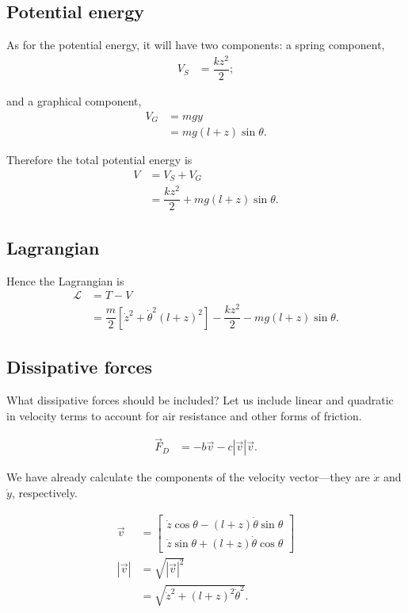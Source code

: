 \documentclass[12pt,a4paper,portrait]{article}
\newcommand{\lag}{\mathcal{L}}
\begin{document}
\subsection{Potential energy}
As for the potential energy, it will have two components: a spring component,
\begin{align*}
	V_S &= \dfrac{kz^2}{2};
\end{align*}

and a graphical component,
\begin{align*}
	V_G &= mgy \\
	&= mg(l+z)\sin{\theta}.
\end{align*}

Therefore the total potential energy is
\begin{align*}
	V &= V_S + V_G \\
	&= \dfrac{kz^2}{2} + mg(l+z)\sin{\theta}.
\end{align*}

\subsection{Lagrangian}
Hence the Lagrangian is
\begin{align*}
	\lag &= T - V \\
	&= \dfrac{m}{2} \left[\dot{z}^2 + \dot{\theta}^2(l+z)^2\right] - \dfrac{kz^2}{2} - mg(l+z)\sin{\theta}.
\end{align*}

\subsection{Dissipative forces}
What dissipative forces should be included? Let us include linear and quadratic in velocity terms to account for air resistance and other forms of friction. 

\begin{align*}
	\vec{F}_D &= -b\vec{v} - c|\vec{v}|\vec{v}.
\end{align*}

We have already calculate the components of the velocity vector---they are $\dot{x}$ and $\dot{y}$, respectively. 

\begin{align*}
	\vec{v} &= \begin{bmatrix}
		\dot{z}\cos{\theta} - (l+z)\dot{\theta}\sin{\theta} \\
		\dot{z}\sin{\theta} + (l+z)\dot{\theta}\cos{\theta}
	\end{bmatrix}\\
	|\vec{v}| &= \sqrt{|\vec{v}|^2}\\
	&= \sqrt{\dot{z}^2+(l+z)^2\dot{\theta}^2}.
\end{align*}
\end{document}
